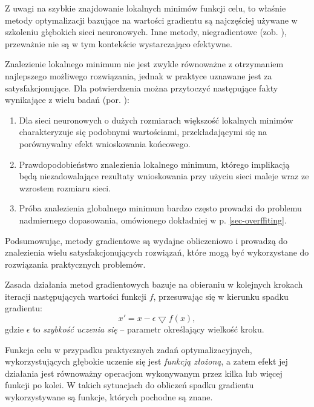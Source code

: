 Z uwagi na szybkie znajdowanie lokalnych minimów funkcji celu, to właśnie metody optymalizacji bazujące na wartości gradientu są najczęściej używane w szkoleniu głębokich sieci neuronowych. Inne metody, niegradientowe (zob. \cite{DBLP:journals/corr/TaylorBXSPG16}), przeważnie nie są w tym kontekście wystarczająco efektywne. 

Znalezienie lokalnego minimum nie jest zwykle równoważne z otrzymaniem najlepszego możliwego rozwiązania, jednak w praktyce uznawane jest za satysfakcjonujące. Dla potwierdzenia można przytoczyć następujące fakty wynikające z wielu badań (por. \cite{DBLP:journals/corr/ChoromanskaHMAL14}):
\begin{enumerate}
	\item Dla sieci neuronowych o dużych rozmiarach większość lokalnych minimów charakteryzuje się podobnymi wartościami, przekładającymi się na porównywalny efekt wnioskowania końcowego.
	\item Prawdopodobieństwo znalezienia lokalnego minimum, którego implikacją będą niezadowalające rezultaty wnioskowania przy użyciu sieci maleje wraz \linebreak ze wzrostem rozmiaru sieci.
	\item Próba znalezienia globalnego minimum bardzo często prowadzi do problemu nadmiernego dopasowania, omówionego dokładniej w p. \ref{sec-overffiting}.
\end{enumerate}

Podsumowując, metody gradientowe są wydajne obliczeniowo i prowadzą do znalezienia wielu satysfakcjonujących rozwiązań, które mogą być wykorzystane do rozwiązania praktycznych problemów. 

Zasada działania metod gradientowych bazuje na obieraniu w kolejnych krokach iteracji następujących wartości funkcji $f$, przesuwając się w kierunku spadku gradientu:
\begin{equation}
x' = x - \epsilon \bigtriangledown f(x),
\end{equation} 
gdzie $\epsilon$ to \textit{szybkość uczenia się} -- parametr określający wielkość kroku. 

Funkcja celu w przypadku praktycznych zadań optymalizacyjnych, wykorzystujących głębokie uczenie się jest \textit{funkcją złożoną}, a zatem efekt jej działania jest równoważny operacjom wykonywanym przez kilka lub więcej funkcji po kolei. \linebreak W takich sytuacjach do obliczeń spadku gradientu wykorzystywane są funkcje, których pochodne są znane.

